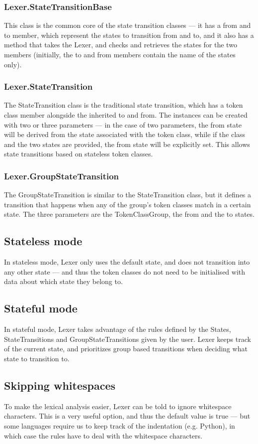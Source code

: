 \subsubsection{Lexer.StateTransitionBase}
This class is the common core of the state transition classes --- it has a from and to member, which represent the states to transition from and to, and it also has a method that takes the Lexer, and checks and retrieves the states for the two members (initially, the to and from members contain the name of the states only).
\subsubsection{Lexer.StateTransition}
The StateTransition class is the traditional state transition, which has a token class member alongside the inherited to and from. The instances can be created with two or three parameters --- in the case of two parameters, the from state will be derived from the state associated with the token class, while if the class and the two states are provided, the from state will be explicitly set. This allows state transitions based on stateless token classes.
\subsubsection{Lexer.GroupStateTransition} 
The GroupStateTransition is similar to the StateTransition class, but it defines a transition that happens when any of the group's token classes match in a certain state. The three parameters are the TokenClassGroup, the from and the to states.
\subsection{Stateless mode}
In stateless mode, Lexer only uses the default state, and does not transition into any other state --- and thus the token classes do not need to be initialised with data about which state they belong to.
\subsection{Stateful mode}
In stateful mode, Lexer takes advantage of the rules defined by the States, StateTransitions and GroupStateTransitions given by the user. Lexer keeps track of the current state, and prioritizes group based transitions when deciding what state to transition to.
\subsection{Skipping whitespaces}
To make the lexical analysis easier, Lexer can be told to ignore whitespace characters. This is a very useful option, and thus the default value is true --- but some languages require us to keep track of the indentation (e.g. Python), in which case the rules have to deal with the whitespace characters.
